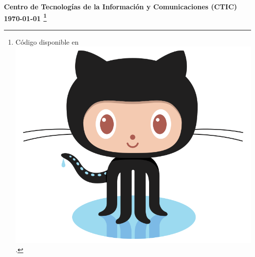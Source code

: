 \documentclass[spanish,addpoints,answers,a4paper]{exam}
\newcommand{\unmarkedfntext}[1]{%
	\begingroup
	\renewcommand\thefootnote{}\footnote{#1}%
	\addtocounter{footnote}{-1}%
	\endgroup
}
\newcommand{\mychar}{%
	\begingroup\normalfont
	\includegraphics[height=\fontcharht\font`\B]{Octocat.png}%
	\endgroup
}
\begin{document}
\begin{flushright}\bfseries
Centro de Tecnologías de la Información y Comunicaciones (CTIC)\\[2mm]
\today\unmarkedfntext{Código disponible en \href{https://github.com/carlosal1015/C-Programming}{\mychar{}}.}
\end{flushright}
\end{document}
